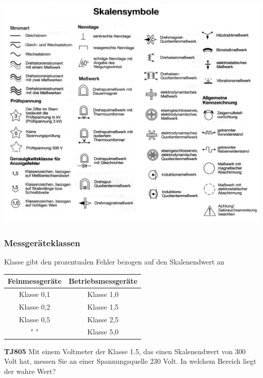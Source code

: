 \begin{frame}
  \begin{center}
    \includegraphics[width=\textwidth,height=\textheight,keepaspectratio]{a16/Symbole.png}
  \end{center}
\end{frame}

\begin{frame}
  \frametitle{Messgeräteklassen}
  Klasse gibt den prozentualen Fehler bezogen auf den Skalenendwert an
  \begin{center}
    \begin{tabular}{c|c}
      \textbf{Feinmessgeräte} & \textbf{Betriebsmessgeräte}\\ \hline
      Klasse 0,1 & Klasse 1,0 \\
      Klasse 0,2 & Klasse 1,5 \\
      Klasse 0,5 & Klasse 2,5 \\
      " " & Klasse 5,0 \\
    \end{tabular}
  \end{center}

  \pause

  \begin{exampleblock}{\textbf{TJ805} Mit einem Voltmeter der Klasse 1.5, das einen Skalenendwert von 300 Volt hat, messen Sie an einer Spannungsquelle 230 Volt. In welchem Bereich liegt der wahre Wert?}
  \end{exampleblock}
\end{frame}

